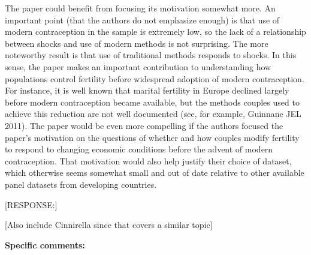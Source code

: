 \documentclass[letterpaper,12pt]{article}
\begin{document}
The paper could benefit from focusing its motivation somewhat more. An
important point (that the authors do not emphasize enough) is that use
of modern contraception in the sample is extremely low, so the lack of a
relationship between shocks and use of modern methods is not surprising.
The more noteworthy result is that use of traditional methods responds
to shocks. In this sense, the paper makes an important contribution to
understanding how populations control fertility before widespread
adoption of modern contraception. For instance, it is well known that
marital fertility in Europe declined largely before modern contraception
became available, but the methods couples used to achieve this reduction
are not well documented (see, for example, Guinnane JEL 2011). The paper
would be even more compelling if the authors focused the paper's
motivation on the questions of whether and how couples modify fertility
to respond to changing economic conditions before the advent of
modern contraception. That motivation would also help justify their
choice of dataset, which otherwise seems somewhat small and out of date
relative to other available panel datasets from developing countries.

[RESPONSE:]

[Also include Cinnirella since that covers a similar topic]



\noindent \textbf{Specific comments:}
\end{document}
